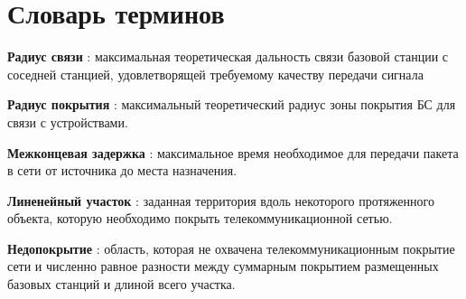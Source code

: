 \chapter*{Словарь терминов}             %


\textbf{Радиус связи} : максимальная теоретическая дальность связи базовой станции с соседней станцией, удовлетворящей требуемому качеству передачи сигнала

\textbf{Радиус покрытия} : максимальный теоретический радиус зоны покрытия БС для связи с устройствами.

\textbf{Межконцевая задержка} : максимальное время необходимое для передачи пакета в сети от источника до места назначения.

\textbf{Линенейный участок} : заданная территория вдоль некоторого протяженного объекта, которую необходимо покрыть телекоммуникационной сетью.

\textbf{Недопокрытие} : область, которая не охвачена телекоммуникационным покрытие сети и численно равное разности между суммарным покрытием размещенных базовых станций и длиной всего участка.